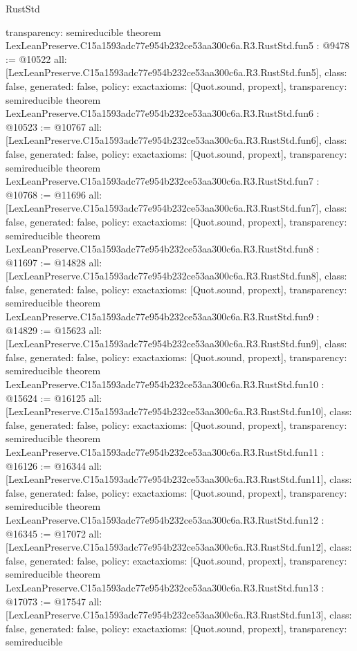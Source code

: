 \begin{lexlean}{RustStd}
\begin{coremodule}
{  transparency: semireducible
}
theorem LexLeanPreserve.C15a1593adc77e954b232ce53aa300c6a.R3.RustStd.fun5 : @9478 := @10522 {
  all: [LexLeanPreserve.C15a1593adc77e954b232ce53aa300c6a.R3.RustStd.fun5],
  class: false,
  generated: false,
  policy: exact{axioms: [Quot.sound, propext]},
  transparency: semireducible
}
theorem LexLeanPreserve.C15a1593adc77e954b232ce53aa300c6a.R3.RustStd.fun6 : @10523 := @10767 {
  all: [LexLeanPreserve.C15a1593adc77e954b232ce53aa300c6a.R3.RustStd.fun6],
  class: false,
  generated: false,
  policy: exact{axioms: [Quot.sound, propext]},
  transparency: semireducible
}
theorem LexLeanPreserve.C15a1593adc77e954b232ce53aa300c6a.R3.RustStd.fun7 : @10768 := @11696 {
  all: [LexLeanPreserve.C15a1593adc77e954b232ce53aa300c6a.R3.RustStd.fun7],
  class: false,
  generated: false,
  policy: exact{axioms: [Quot.sound, propext]},
  transparency: semireducible
}
theorem LexLeanPreserve.C15a1593adc77e954b232ce53aa300c6a.R3.RustStd.fun8 : @11697 := @14828 {
  all: [LexLeanPreserve.C15a1593adc77e954b232ce53aa300c6a.R3.RustStd.fun8],
  class: false,
  generated: false,
  policy: exact{axioms: [Quot.sound, propext]},
  transparency: semireducible
}
theorem LexLeanPreserve.C15a1593adc77e954b232ce53aa300c6a.R3.RustStd.fun9 : @14829 := @15623 {
  all: [LexLeanPreserve.C15a1593adc77e954b232ce53aa300c6a.R3.RustStd.fun9],
  class: false,
  generated: false,
  policy: exact{axioms: [Quot.sound, propext]},
  transparency: semireducible
}
theorem LexLeanPreserve.C15a1593adc77e954b232ce53aa300c6a.R3.RustStd.fun10 : @15624 := @16125 {
  all: [LexLeanPreserve.C15a1593adc77e954b232ce53aa300c6a.R3.RustStd.fun10],
  class: false,
  generated: false,
  policy: exact{axioms: [Quot.sound, propext]},
  transparency: semireducible
}
theorem LexLeanPreserve.C15a1593adc77e954b232ce53aa300c6a.R3.RustStd.fun11 : @16126 := @16344 {
  all: [LexLeanPreserve.C15a1593adc77e954b232ce53aa300c6a.R3.RustStd.fun11],
  class: false,
  generated: false,
  policy: exact{axioms: [Quot.sound, propext]},
  transparency: semireducible
}
theorem LexLeanPreserve.C15a1593adc77e954b232ce53aa300c6a.R3.RustStd.fun12 : @16345 := @17072 {
  all: [LexLeanPreserve.C15a1593adc77e954b232ce53aa300c6a.R3.RustStd.fun12],
  class: false,
  generated: false,
  policy: exact{axioms: [Quot.sound, propext]},
  transparency: semireducible
}
theorem LexLeanPreserve.C15a1593adc77e954b232ce53aa300c6a.R3.RustStd.fun13 : @17073 := @17547 {
  all: [LexLeanPreserve.C15a1593adc77e954b232ce53aa300c6a.R3.RustStd.fun13],
  class: false,
  generated: false,
  policy: exact{axioms: [Quot.sound, propext]},
  transparency: semireducible
}
\end{coremodule}
\end{lexlean}
